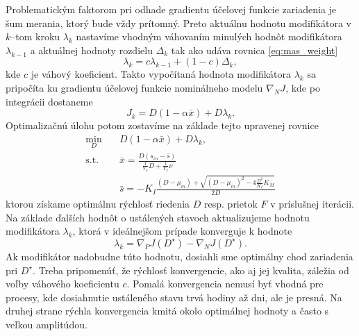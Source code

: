 Problematickým faktorom pri odhade gradientu účelovej funkcie zariadenia je šum merania, ktorý bude vždy prítomný. Preto aktuálnu hodnotu modifikátora v $ k $--tom kroku $ \lambda_k $ nastavíme vhodným váhovaním minulých hodnôt modifikátora $ \lambda_{k-1} $ a aktuálnej hodnoty rozdielu $ \Delta_{k} $ tak ako udáva rovnica \eqref{eq:mas_weight}
\begin{equation*}
	\lambda_k = c\lambda_{k-1} + \left(1 - c\right)\Delta_{k},
\end{equation*}
kde $ c $ je váhový koeficient. Takto vypočítaná hodnota modifikátora $ \lambda_k $ sa pripočíta ku gradientu účelovej funkcie nominálneho modelu $ \nabla_{N}J $, kde po integrácii dostaneme
\begin{equation}
	J_{k} = D\left(1-\alpha\bar{x}\right) + D\lambda_k.
\end{equation}
Optimalizačnú úlohu potom zostavíme na základe tejto upravenej rovnice
\begin{equation}
	\begin{split}
		\min_{D} &\quad D\left(1-\alpha\bar{x}\right) + D\lambda_k, \\
		\text{s.t.} &\quad \bar{x} = \frac{D\left(s_{in}-\bar{s}\right)}{\frac{1}{Y_{x}}D + \frac{1}{Y_{x}}\nu} \\
		&\quad \bar{s} = -K_{I}\frac{\left(D-\mu_{m}\right) + \sqrt{\left(D-\mu_{m}\right)^2 - 4\frac{D^2}{K_{I}}K_{M}}}{2D}
	\end{split}
\end{equation}
ktorou získame optimálnu rýchlosť riedenia $ D $ resp. prietok $ F $ v príslušnej iterácii. Na základe ďalších hodnôt o ustálených stavoch aktualizujeme hodnotu modifikátora $ \lambda_k $, ktorá v ideálnejšom prípade konverguje k hodnote
\begin{equation}
	\label{eq:mas_opt_lambda}
	\lambda_k = \nabla_{P}J\left(D^{\star}\right) - \nabla_{N}J\left(D^{\star}\right).
\end{equation} 
Ak modifikátor nadobudne túto hodnotu, dosiahli sme optimálny chod zariadenia pri $ D^{\star} $. Treba pripomenúť, že rýchlosť konvergencie, ako aj jej kvalita, záležia od voľby váhového koeficientu $ c $. Pomalá konvergencia nemusí byť vhodná pre procesy, kde dosiahnutie ustáleného stavu trvá hodiny až dni, ale je presná. Na druhej strane rýchla konvergencia kmitá okolo optimálnej hodnoty a často s veľkou amplitúdou.
